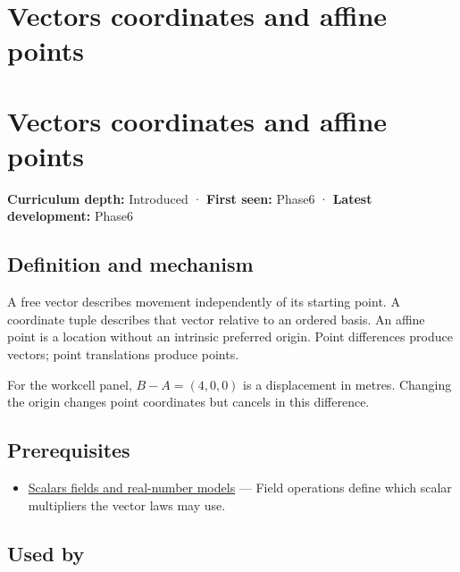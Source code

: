 \hypertarget{appendix-0659864c0aa3}{}
\section*{Vectors coordinates and affine points}
\section{Vectors coordinates and affine points}\label{appendix-0659864c0aa3-vectors-coordinates-and-affine-points}

\textbf{Curriculum depth:} Introduced · \textbf{First seen:} Phase6 · \textbf{Latest development:} Phase6

\subsection{Definition and mechanism}\label{appendix-0659864c0aa3-definition-and-mechanism}

A free vector describes movement independently of its starting point. A coordinate tuple describes that vector relative to an ordered basis. An affine point is a location without an intrinsic preferred origin. Point differences produce vectors; point translations produce points.

For the workcell panel, \(B-A=(4,0,0)\) is a displacement in metres. Changing the origin changes point coordinates but cancels in this difference.

\subsection{Prerequisites}\label{appendix-0659864c0aa3-prerequisites}

\begin{itemize}
\tightlist
\item
  \hyperref[appendix-52051ad550fe]{Scalars fields and real-number models} --- Field operations define which scalar multipliers the vector laws may use.
\end{itemize}

\subsection{Used by}\label{appendix-0659864c0aa3-used-by}

